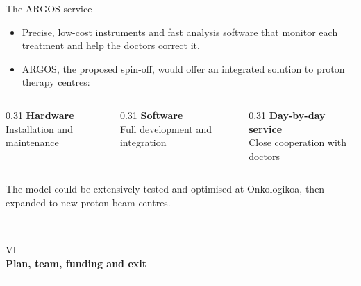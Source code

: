 \documentclass[aspectratio=169,11pt]{beamer}
\newcommand{\hi}[1]{\textcolor{crRed}{#1}}
\begin{document}
\begin{frame}{The ARGOS service}
\small
\begin{itemize}
\item \hi{Precise, low-cost instruments} and fast analysis software that monitor each treatment and help the doctors correct it.
\item \hi{ARGOS}, the proposed spin-off, would offer an integrated solution to proton therapy centres:
\end{itemize}
\par\vspace{2mm}
\begin{columns}[T,onlytextwidth]
\begin{column}{0.31\textwidth}
\centering\textbf{Hardware}\\[2mm]
Installation and maintenance
\end{column}
\begin{column}{0.31\textwidth}
\centering\textbf{Software}\\[2mm]
Full development and integration
\end{column}
\begin{column}{0.31\textwidth}
\centering\textbf{Day-by-day service}\\[2mm]
Close cooperation with doctors
\end{column}
\end{columns}
\par\vspace{5mm}
The model could be extensively tested and optimised at \hi{Onkologikoa}, then expanded to new proton beam centres.
\end{frame}













\begin{frame}
\centering
\vspace{1.6cm}
{\color{crBlue}\rule{0.55\textwidth}{1.1pt}}\\[6mm]
{\Large\color{crGrey} VI}\\[4mm]
{\Huge\bfseries\color{crBlue} Plan, team, funding and exit}\\[6mm]
{\color{crBlue}\rule{0.55\textwidth}{1.1pt}}
\end{frame}
\end{document}
